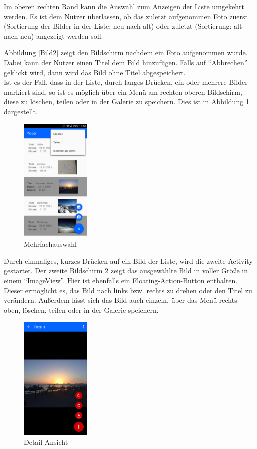 Im oberen rechten Rand kann die Auswahl zum Anzeigen der Liste umgekehrt werden. Es ist dem Nutzer überlassen, ob das zuletzt aufgenommen Foto zuerst (Sortierung der Bilder in der Liste: neu nach alt) oder zuletzt (Sortierung: alt nach neu) angezeigt werden soll.



Abbildung \ref{Bild2} zeigt den Bildschirm nachdem ein Foto aufgenommen wurde.
Dabei kann der Nutzer einen Titel dem Bild hinzufügen. Falls auf \enquote{Abbrechen}
 geklickt wird, dann wird das Bild ohne Titel abgespeichert.\\

Ist es der Fall, dass in der Liste, durch langes Drücken, ein oder mehrere Bilder markiert sind, so ist es möglich über ein Menü am rechten oberen Bildschirm, diese zu löschen, teilen oder in der Galerie zu speichern. Dies ist in Abbildung \ref{Bild3} dargestellt.
\begin{figure}[H]
\centering
\includegraphics[width=0.3\textwidth]{images/bild_3}
\caption{Mehrfachauswahl}
\label{Bild3}
\end{figure}

Durch einmaliges, kurzes Drücken auf ein Bild der Liste, wird die zweite Activity
gestartet. Der zweite Bildschirm \ref{Bild4} zeigt das ausgewählte Bild in voller Größe in einem \enquote{ImageView}. Hier ist ebenfalls ein Floating-Action-Button enthalten. Dieser ermöglicht es, das Bild nach links bzw. rechts zu drehen oder den Titel zu verändern.
Außerdem lässt sich das Bild auch einzeln, über das Menü rechts oben, löschen, teilen oder in der Galerie speichern.

\begin{figure}[H]
\begin{center}
\includegraphics[width=0.3\textwidth]{images/bild_4}
\end{center}

\caption{Detail Ansicht}
\label{Bild4}
\end{figure}

